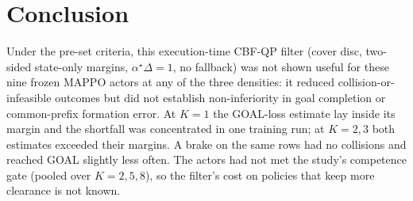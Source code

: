 \documentclass[11pt]{article}
\begin{document}
\section{Conclusion}
Under the pre-set criteria, this execution-time CBF-QP filter (cover disc, two-sided state-only
margins, $\alpha^\star\Delta=1$, no fallback) was not shown useful for these nine frozen MAPPO actors at
any of the three densities: it reduced collision-or-infeasible outcomes but did not establish
non-inferiority in goal completion or common-prefix formation error. At $K=1$ the GOAL-loss estimate lay
inside its margin and the shortfall was concentrated in one training run; at $K=2,3$ both estimates
exceeded their margins. A brake on the same rows had no collisions and reached GOAL slightly less often.
The actors had not met the study's competence gate (pooled over $K=2,5,8$), so the filter's cost on
policies that keep more clearance is not known.
\end{document}
